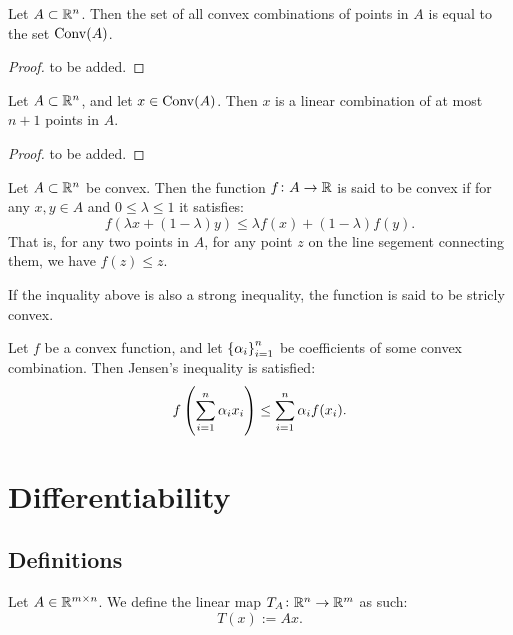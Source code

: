 \documentclass[11pt,a4paper]{article}
\begin{document}
\begin{proposition}
  Let $A \subset \mathbb{R}^n$.
  Then the set of all convex combinations of points in $A$ is equal
  to the set $\operatorname{Conv}(A)$.
\end{proposition}
\begin{proof}
  to be added.
\end{proof}

\begin{theorem}
  Let $A \subset \mathbb{R}^n$,
  and let $x \in \operatorname{Conv}(A)$.
  Then $x$ is a linear combination of at most $n + 1$ points in $A$.
\end{theorem}
\begin{proof}
  to be added.
\end{proof}

\begin{definition}
  Let $A \subset \mathbb{R}^n$ be convex.
  Then the function $f \colon A \to \mathbb{R}$ is said to be convex if
  for any $x,y \in A$ and $0 \le \lambda \le 1$ it satisfies:
  \[
    f(\lambda x + (1 - \lambda) y) \le
    \lambda f(x) + (1 - \lambda) f(y).
  \]
  That is, for any two points in $A$, for any point $z$ on the line segement
  connecting them, we have $f(z) \le z$.
\end{definition}
\begin{remark}
  If the inquality above is also a strong inequality,
  the function is said to be stricly convex.
\end{remark}

\begin{theorem}
  Let $f$ be a convex function,
  and let $\left\{\alpha_i\right\}_{i=1}^{n}$ be coefficients of some convex
  combination.
  Then Jensen's inequality is satisfied:
  \[
    f\del{\sum_{i=1}^{n} \alpha_i x_i} \le \sum_{i=1}^{n} \alpha_i f(x_i).
  \]
\end{theorem}

\newpage

\section{Differentiability}
\subsection{Definitions}
\begin{definition}
  Let $A \in \mathbb{R}^{m \times n}$.
  We define the linear map $T_A \colon \mathbb{R}^n \to \mathbb{R}^m$ as such:
  \[
    T(x) := Ax.
  \]
\end{definition}
\end{document}
